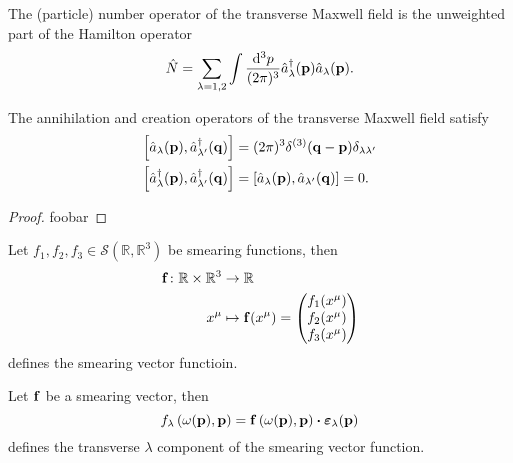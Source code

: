 \begin{definition}\label{thm:qmw_number}
	The (particle) number operator of the transverse Maxwell field is the unweighted part of the Hamilton operator
	\begin{equation}
		\label{eq:qmw_number}
		\hat{N}
		=
		\sum_{\lambda=1,2}
		\int\frac{\dd[3]{p}}{(2\pi)^3}
		\hat{a}_\lambda^\dagger(\vb{p})
		\hat{a}_\lambda(\vb{p})
		.
	\end{equation}
\end{definition}
\begin{lemma}\label{thm:qmw_comm_ac}
	The annihilation and creation operators of the transverse Maxwell field satisfy
	\begin{align}
		\label{eq:qmw_comm_ac}
		\comm{\hat{a}_\lambda(\vb{p})}{\hat{a}_{\lambda^\prime}^\dagger(\vb{q})}
		&=
		(2\pi)^3
		\delta^{(3)}(\vb{q}-\vb{p})
		\delta_{\lambda\lambda^\prime}
		\\
		\comm{\hat{a}_\lambda^\dagger(\vb{p})}{\hat{a}_{\lambda^\prime}^\dagger(\vb{q})}
		&=
		\comm{\hat{a}_\lambda(\vb{p})}{\hat{a}_{\lambda^\prime}(\vb{q})}
		=
		0
		.
	\end{align}
\end{lemma}
\begin{proof}
	foobar
\end{proof}

\begin{definition}
	Let $f_1,f_2,f_3\in\mathcal{S}(\mathbb{R},\mathbb{R}^3)$ be smearing functions, then
	\begin{equation}
		\begin{split}
			\vb{f}
			\colon
			\mathbb{R}\times \mathbb{R}^3
			&\to
			\mathbb{R}
			\\
			x^\mu
			&\mapsto
			\vb{f}(x^\mu)
			=
			\begin{pmatrix}
				f_1(x^\mu) \\
				f_2(x^\mu) \\
				f_3(x^\mu)				
			\end{pmatrix}
		\end{split}
	\end{equation}
	defines the smearing vector functioin.
\end{definition}
\begin{definition}
	Let $\vb{f}$ be a smearing vector, then
	\begin{equation}
		\label{eq:qmw_transverse_smearing_function}
		f_\lambda\left(\omega(\vb{p}),\vb{p}\right)
		=
		\vb{f}\left(\omega(\vb{p}),\vb{p}\right)
		\vdot
		\boldsymbol{\varepsilon}_\lambda(\vb{p})
	\end{equation}
	defines the transverse $\lambda$ component of the smearing vector function.
\end{definition}

